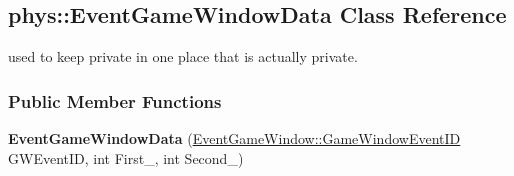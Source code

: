 \hypertarget{classphys_1_1EventGameWindowData}{
\subsection{phys::EventGameWindowData Class Reference}
\label{d1/d45/classphys_1_1EventGameWindowData}
}


used to keep private in one place that is actually private.  


\subsubsection*{Public Member Functions}
\begin{DoxyCompactItemize}
\item 
\hypertarget{classphys_1_1EventGameWindowData_a2b7b09702492bb6a83be2da2a70814c2}{
{\bfseries EventGameWindowData} (\hyperlink{classphys_1_1EventGameWindow_a45225255070513d3cff88cdfea25cc09}{EventGameWindow::GameWindowEventID} GWEventID, int First\_\-, int Second\_\-)}
\label{d1/d45/classphys_1_1EventGameWindowData_a2b7b09702492bb6a83be2da2a70814c2}

\end{DoxyCompactItemize}
